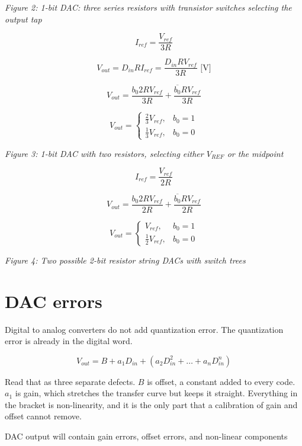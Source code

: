 \emph{Figure 2: 1-bit DAC: three series resistors with transistor
switches selecting the output tap}

\[ I_{ref} = \frac{V_{ref}}{3 R}\]

\[ V_{out} = D_{in} R I_{ref} = \frac{D_{in} R V_{ref}}{3 R} \text{ [V]} \]

\[ V_{out} = \frac{b_0 2 R V_{ref}}{3 R}  + \frac{\overline{b_0} R V_{ref}}{3 R} \]

\[  V_{out} = \begin{cases} 
\frac{2}{3} V_{ref}, & b_0 = 1 \\
\frac{1}{3} V_{ref}, & b_0 = 0 
\end{cases}
\]


{
\centering
{}
}

\emph{Figure 3: 1-bit DAC with two resistors, selecting either
\(V_{REF}\) or the midpoint}

\[ I_{ref} = \frac{V_{ref}}{2 R}\]

\[ V_{out} = \frac{b_0 2 R V_{ref}}{2 R}  + \frac{\overline{b_0} R V_{ref}}{2 R} \]

\[  V_{out} = \begin{cases} 
 V_{ref}, & b_0 = 1 \\
\frac{1}{2} V_{ref}, & b_0 = 0 
\end{cases}
\]


{
\centering
{}
}

\emph{Figure 4: Two possible 2-bit resistor string DACs with switch
trees}

\section{DAC errors}\label{dac-errors}

Digital to analog converters do not add quantization error. The
quantization error is already in the digital word.

\[ V_{out} = B + a_1 D_{in} + \left( a_2 D_{in}^2 + \dots + a_n D_{in}^n \right) \]

Read that as three separate defects. \(B\) is offset, a constant added
to every code. \(a_1\) is gain, which stretches the transfer curve but
keeps it straight. Everything in the bracket is non-linearity, and it is
the only part that a calibration of gain and offset cannot remove.

DAC output will contain gain errors, offset errors, and non-linear
components


